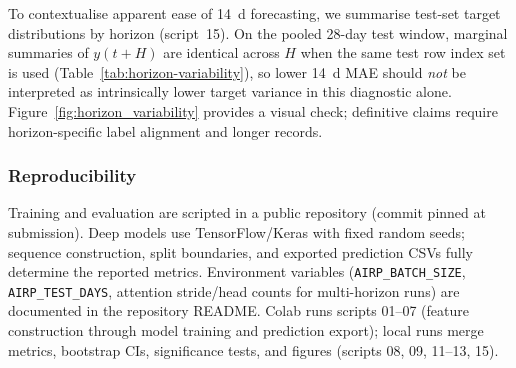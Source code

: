 \documentclass[a4paper,fleqn]{cas-sc}
\begin{document}
To contextualise apparent ease of 14~d forecasting, we summarise test-set target distributions by horizon (script~15). On the pooled 28-day test window, marginal summaries of $y(t+H)$ are identical across $H$ when the same test row index set is used (Table~\ref{tab:horizon-variability}), so lower 14~d MAE should \emph{not} be interpreted as intrinsically lower target variance in this diagnostic alone. Figure~\ref{fig:horizon_variability} provides a visual check; definitive claims require horizon-specific label alignment and longer records.

\subsubsection{Reproducibility}

Training and evaluation are scripted in a public repository (commit pinned at submission). Deep models use TensorFlow/Keras with fixed random seeds; sequence construction, split boundaries, and exported prediction CSVs fully determine the reported metrics. Environment variables (\texttt{AIRP\_BATCH\_SIZE}, \texttt{AIRP\_TEST\_DAYS}, attention stride/head counts for multi-horizon runs) are documented in the repository README. Colab runs scripts 01--07 (feature construction through model training and prediction export); local runs merge metrics, bootstrap CIs, significance tests, and figures (scripts 08, 09, 11--13, 15).
\end{document}
